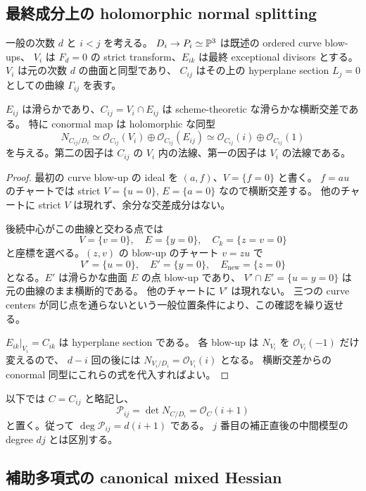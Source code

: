\subsection{最終成分上の holomorphic normal splitting}

一般の次数 $d$ と $i<j$ を考える。
$D_i\to P_i\simeq\mathbb P^3$ は既述の ordered curve blow-ups、
$V_i$ は $F_d=0$ の strict transform、$E_{ik}$ は最終 exceptional divisors とする。
$V_i$ は元の次数 $d$ の曲面と同型であり、
$C_{ij}$ はその上の hyperplane section $L_j=0$ としての曲線 $\Gamma_{ij}$ を表す。

\begin{proposition}\label{sc:normal-splitting}
$E_{ij}$ は滑らかであり、$C_{ij}=V_i\cap E_{ij}$ は scheme-theoretic な滑らかな横断交差である。
特に conormal map は holomorphic な同型
\[
 N_{C_{ij}/D_i}\simeq
 \mathcal O_{C_{ij}}(V_i)\oplus\mathcal O_{C_{ij}}(E_{ij})
 \simeq\mathcal O_{C_{ij}}(i)\oplus\mathcal O_{C_{ij}}(1)
\]
を与える。第二の因子は $C_{ij}$ の $V_i$ 内の法線、第一の因子は $V_i$ の法線である。
\end{proposition}

\begin{proof}
最初の curve blow-up の ideal を $(a,f)$、$V=\{f=0\}$ と書く。
$f=au$ のチャートでは strict $V=\{u=0\}$, $E=\{a=0\}$ なので横断交差する。
他のチャートに strict $V$ は現れず、余分な交差成分はない。

後続中心がこの曲線と交わる点では
\[
 V=\{v=0\},\quad E=\{y=0\},\quad C_k=\{z=v=0\}
\]
と座標を選べる。$(z,v)$ の blow-up のチャート $v=zu$ で
\[
 V'=\{u=0\},\quad E'=\{y=0\},\quad E_{\mathrm{new}}=\{z=0\}
\]
となる。$E'$ は滑らかな曲面 $E$ の点 blow-up であり、
$V'\cap E'=\{u=y=0\}$ は元の曲線のまま横断的である。
他のチャートに $V'$ は現れない。
三つの curve centers が同じ点を通らないという一般位置条件により、この確認を繰り返せる。

$E_{ik}|_{V_i}=C_{ik}$ は hyperplane section である。
各 blow-up は $N_{V_i}$ を $\mathcal O_{V_i}(-1)$ だけ変えるので、
$d-i$ 回の後には $N_{V_i/D_i}=\mathcal O_{V_i}(i)$ となる。
横断交差からの conormal 同型にこれらの式を代入すればよい。
\end{proof}

以下では $C=C_{ij}$ と略記し、
\[
 \mathcal P_{ij}=\det N_{C/D_i}=\mathcal O_C(i+1)
\]
と置く。従って $\deg\mathcal P_{ij}=d(i+1)$ である。
$j$ 番目の補正直後の中間模型の degree $dj$ とは区別する。

\subsection{補助多項式の canonical mixed Hessian}

